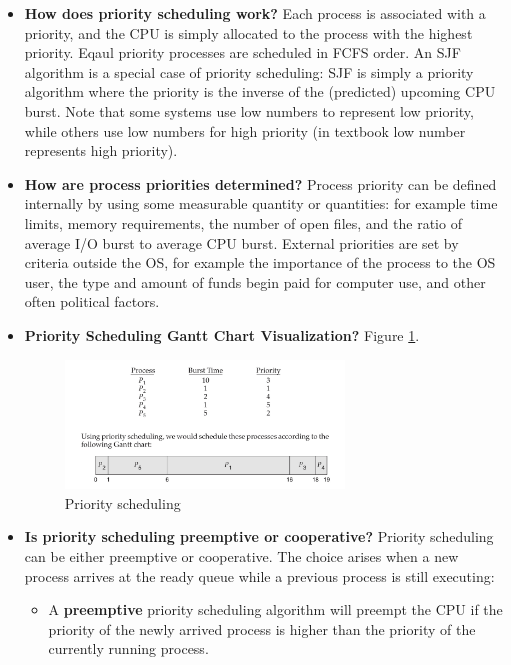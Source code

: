 \documentclass[12pt]{article}
\begin{document}
\begin{itemize}
    \item \textbf{How does priority scheduling work?} Each process is associated with a priority, and the CPU is simply allocated to the process with the highest priority. Eqaul priority processes are scheduled in FCFS order. An SJF algorithm is a special case of priority scheduling: SJF is simply a priority algorithm where the priority is the inverse of the (predicted) upcoming CPU burst. Note that some systems use low numbers to represent low priority, while others use low numbers for high priority (in textbook low number represents high priority).
    \item \textbf{How are process priorities determined?} Process priority can be defined internally by using some measurable quantity or quantities: for example time limits, memory requirements, the number of open files, and the ratio of average I/O burst to average CPU burst. External priorities are set by criteria outside the OS, for example the importance of the process to the OS user, the type and amount of funds begin paid for computer use, and other often political factors.
    \item \textbf{Priority Scheduling Gantt Chart Visualization?} Figure \ref{fig:priority-scheduling}.
        \begin{figure}[ht]
            \centering
            \includegraphics[width=0.7\textwidth]{figures/priority-scheduling.png}
            \caption{Priority scheduling}
            \label{fig:priority-scheduling}
        \end{figure}
    \item \textbf{Is priority scheduling preemptive or cooperative?} Priority scheduling can be either preemptive or cooperative. The choice arises when a new process arrives at the ready queue while a previous process is still executing:
        \begin{itemize}
            \item A \textbf{preemptive} priority scheduling algorithm will preempt the CPU if the priority of the newly arrived process is higher than the priority of the currently running process.

\end{itemize}
\end{itemize}
\end{document}
